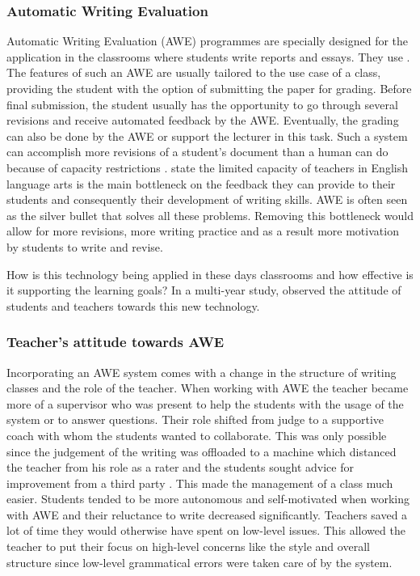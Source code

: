 \documentclass[runningheads]{llncs}
\begin{document}
\subsubsection{Automatic Writing Evaluation}
Automatic Writing Evaluation (AWE) programmes are specially designed for the application in the classrooms where students write reports and essays. They use  .
The features of such an AWE are usually tailored to the use case of a class, providing the student with the option of submitting the paper for grading. Before final submission, the student usually has the opportunity to go through several revisions and receive automated feedback by the AWE. Eventually, the grading can also be done by the AWE or support the lecturer in this task. Such a system can accomplish more revisions of a student's document than a human can do because of capacity restrictions \citep{warschauer_automated_2006}. \textcite{grimes_utility_2010} state the limited capacity of teachers in English language arts is the main bottleneck on the feedback they can provide to their students and consequently their development of writing skills. AWE is often seen as the silver bullet that solves all these problems. Removing this bottleneck would allow for more revisions, more writing practice and as a result more motivation by students to write and revise.        

How is this technology being applied in these days classrooms and how effective is it supporting the learning goals? In a multi-year study, \textcite{grimes_utility_2010} observed the attitude of students and teachers towards this new technology. 

\subsubsection{Teacher's attitude towards AWE}
Incorporating an AWE system comes with a change in the structure of writing classes and the role of the teacher. When working with AWE the teacher became more of a supervisor who was present to help the students with the usage of the system or to answer questions. Their role shifted from judge to a supportive coach with whom the students wanted to collaborate. This was only possible since the judgement of the writing was offloaded to a machine which distanced the teacher from his role as a rater and the students sought advice for improvement from a third party \citep{grimes_utility_2010}. This made the management of a class much easier. Students tended to be more autonomous and self-motivated when working with AWE and their reluctance to write decreased significantly. Teachers saved a lot of time they would otherwise have spent on low-level issues. This allowed the teacher to put their focus on high-level concerns like the style and overall structure since low-level grammatical errors were taken care of by the system.
\end{document}

